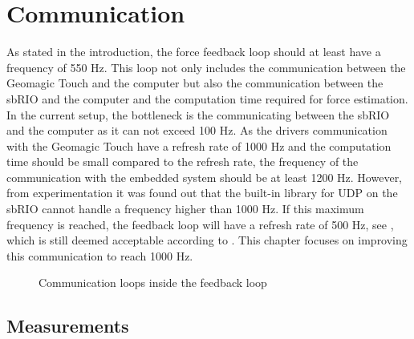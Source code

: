 \chapter{Communication}\label{cha:communication}

As stated in the introduction, the force feedback loop should at least have a frequency of 550 Hz. This loop not only includes the communication between the Geomagic Touch and the computer but also the communication between the sbRIO and the computer and the computation time required for force estimation. In the current setup, the bottleneck is the communicating between the sbRIO and the computer as it can not exceed 100 Hz. As the drivers communication with the Geomagic Touch have a refresh rate of 1000 Hz and the computation time should be small compared to the refresh rate, the frequency of the communication with the embedded system should be at least 1200 Hz. However, from experimentation it was found out that the built-in library for UDP on the sbRIO cannot handle a frequency higher than 1000 Hz. If this maximum frequency is reached, the feedback loop will have a refresh rate of 500 Hz, see , which is still deemed acceptable according to \cite{coles2011role}.  This chapter focuses on improving this communication to reach 1000 Hz.

\begin{figure}[H]
	\centering
	
	\caption{Communication loops inside the feedback loop}
	\label{fig:speed_graph}
\end{figure}











\section{Measurements}



